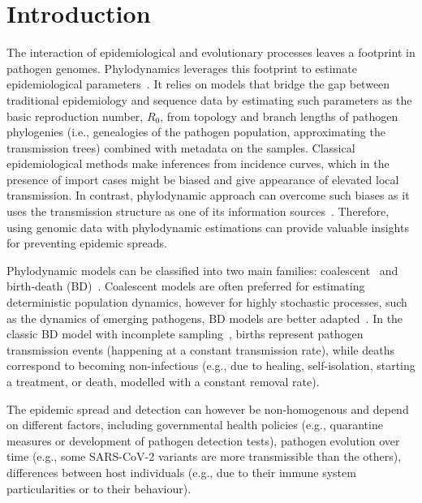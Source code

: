 \documentclass[10pt,letterpaper]{article}
\begin{document}
\linenumbers

\section*{Introduction}
The interaction of epidemiological and evolutionary processes leaves a footprint in pathogen genomes. Phylodynamics leverages this footprint to estimate epidemiological parameters~\cite{Grenfell2004a,Volz2013}. It relies on models that bridge the gap between traditional epidemiology and sequence data by estimating such parameters as the basic reproduction number, $R_0$, from topology and branch lengths of pathogen phylogenies (i.e., genealogies of the pathogen population, approximating the transmission trees) combined with metadata on the samples. Classical epidemiological methods make inferences from incidence curves, which in the presence of import cases might be biased and give appearance of elevated local transmission. In contrast, phylodynamic approach can overcome such biases as it uses the transmission structure as one of its information sources~\cite{vaughanEstimatesEarlyOutbreakspecific2024}. Therefore, using genomic data with phylodynamic estimations can provide valuable insights for preventing epidemic spreads.


Phylodynamic models can be classified into two main families:  coalescent~\cite{Volz2009a,Drummond2005,Pybus2000a} and birth-death (BD)~\cite{Kendall1948,Maddison2007,Stadler2009,Stadler2010}. Coalescent models are often preferred for estimating deterministic population dynamics, however for highly stochastic processes, such as the dynamics of emerging pathogens, BD models are better adapted~\cite{Macpherson2021}. In the classic BD model with incomplete sampling~\cite{Stadler2009}, births represent pathogen transmission events (happening at a constant transmission rate), while deaths correspond to becoming non-infectious (e.g., due to healing, self-isolation, starting a treatment, or death, modelled with a constant removal rate). 

The epidemic spread and detection can however be non-homogenous and depend on different factors, including governmental health policies (e.g., quarantine measures or development of pathogen detection tests), pathogen evolution over time (e.g., some SARS-CoV-2 variants are more transmissible than the others),  differences between host individuals (e.g., due to their immune system particularities or to their behaviour).
\end{document}
